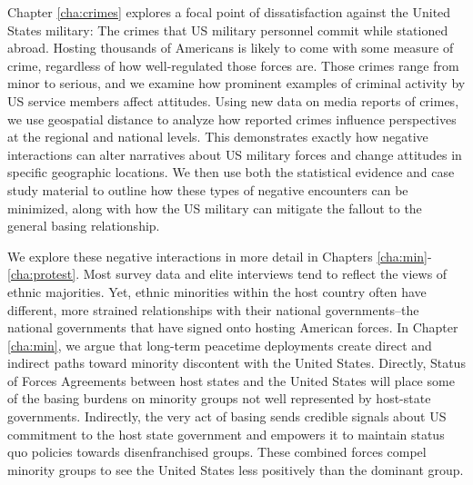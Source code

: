 Chapter \ref{cha:crimes} explores a focal point of dissatisfaction against the United States military: The crimes that US military personnel commit while stationed abroad. Hosting thousands of Americans is likely to come with some measure of crime, regardless of how well-regulated those forces are. Those crimes range from minor to serious, and we examine how prominent examples of criminal activity by US service members affect attitudes. Using new data on media reports of crimes, we use geospatial distance to analyze how reported crimes influence perspectives at the regional and national levels. This demonstrates exactly how negative interactions can alter narratives about US military forces and change attitudes in specific geographic locations. We then use both the statistical evidence and case study material to outline how these types of negative encounters can be minimized, along with how the US military can mitigate the fallout to the general basing relationship. 


We explore these negative interactions in more detail in Chapters \ref{cha:min}-\ref{cha:protest}. Most survey data and elite interviews tend to reflect the views of ethnic majorities. Yet, ethnic minorities within the host country often have different, more strained relationships with their national governments--the national governments that have signed onto hosting American forces. In Chapter \ref{cha:min}, we argue that long-term peacetime deployments create direct and indirect paths toward minority discontent with the United States. Directly, Status of Forces Agreements between host states and the United States will place some of the basing burdens on minority groups not well represented by host-state governments. Indirectly, the very act of basing sends credible signals about US commitment to the host state government and empowers it to maintain status quo policies towards disenfranchised groups. These combined forces compel minority groups to see the United States less positively than the dominant group.



